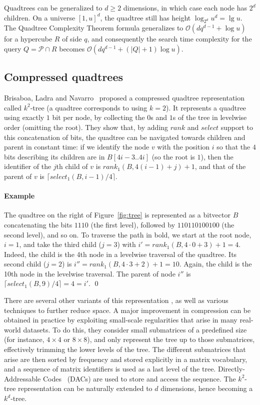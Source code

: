 \documentclass{elsarticle}
\newcommand{\Oh}[1]
  {\ensuremath{\mathcal{O}\!\left( {#1} \right)}}
\newenvironment{example}{\paragraph{Example}}{\qed \medskip }
\begin{document}
\medskip

Quadtrees can be generalized to $d \ge 2$ dimensions, in which case each node 
has $2^d$ children. On a universe $[1,u]^d$, the quadtree still has height 
$\log_{2^d} u^d = \lg u$. The Quadtree Complexity Theorem formula generalizes
to $\Oh{dq^{d-1}+\log u}$ for a hypercube $R$ of side $q$, and consequently
the search time complexity for the query $Q=\mathcal{P} \cap R$ becomes
$\Oh{d q^{d-1} + (|Q|+1) \log u}$.

\subsection{Compressed quadtrees}
\label{sec:comprquad}

Brisaboa, Ladra and Navarro~\cite{BLN14} proposed a compressed quadtree representation called $k^2$-tree (a quadtree corresponds to using $k=2$). It represents a quadtree using exactly $1$ bit per node, by collecting the $0$s and $1$s of the tree in levelwise order (omitting the root). 
They show that, by adding $rank$ and $select$ support to this concatenation of bits, the quadtree can be navigated towards children and parent in constant time: if we identify the node $v$ with the position $i$ so that the $4$ bits describing its children are in $B[4i-3..4i]$ (so the root is $1$), then the identifier of the $j$th child of $v$ is $rank_1(B,4(i-1)+j)+1$, and that of the parent of $v$ is $\lceil select_1(B,i-1)/4\rceil$.

\begin{example}
The quadtree on the right of Figure~\ref{fig:tree} is represented as a bitvector $B$ concatenating the bits $1110$ (the first level), followed by $110110100100$ (the second level), and so on. To traverse the path in bold, we start at the
root node, $i=1$, and take the third child ($j=3$) with 
$i' = rank_1(B,4\cdot 0+3)+1 = 4$. Indeed, the child is the 4th node in a
levelwise traversal of the quadtree. Its second child ($j=2$) is
$i'' = rank_1(B,4\cdot 3+2)+1=10$. Again, the child is the 10th node in the
levelwise traversal. The parent of node $i''$ is $\lceil select_1(B,9)/4\rceil
= 4 = i'$.
\end{example}




There are several other variants of this representation \cite{VM14,BCBNP20}, as well as various techniques to further reduce space.
A major improvement in compression \cite{BLN14} can be obtained in practice by exploiting small-scale regularities that arise in many real-world datasets. To do this, they consider small submatrices of a predefined size (for instance, $4\times4$ or $8\times8$), and only represent the tree up to those submatrices, effectively trimming the lower levels of the tree. The different submatrices that arise are then sorted by frequency and stored explicitly in a matrix vocabulary, and a sequence of matrix identifiers is used as a last level of the tree. Directly-Addressable Codes~\cite{BLN13} (DACs) are used to store and access the sequence.
The $k^2$-tree representation can be naturally extended to $d$ dimensions, hence becoming a 
$k^d$-tree.
\end{document}
